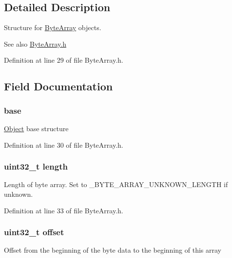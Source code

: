 \subsection{Detailed Description}
Structure for \hyperlink{struct_byte_array}{ByteArray} objects. 

\begin{DoxySeeAlso}{See also}
\hyperlink{_byte_array_8h}{ByteArray.h} 
\end{DoxySeeAlso}


Definition at line 29 of file ByteArray.h.



\subsection{Field Documentation}
\hypertarget{struct_byte_array_a23cf4ef56ba22bed625eab08d6361fa7}{
\subsubsection[{base}]{ {\bf base}}}
\label{struct_byte_array_a23cf4ef56ba22bed625eab08d6361fa7}
\hyperlink{struct_object}{Object} base structure 

Definition at line 30 of file ByteArray.h.

\hypertarget{struct_byte_array_aebb70c2aab3407a9f05334c47131a43b}{
\subsubsection[{length}]{\setlength{\rightskip}{0pt plus 5cm}uint32\_\-t {\bf length}}}
\label{struct_byte_array_aebb70c2aab3407a9f05334c47131a43b}
Length of byte array. Set to \_\-BYTE\_\-ARRAY\_\-UNKNOWN\_\-LENGTH if unknown. 

Definition at line 33 of file ByteArray.h.

\hypertarget{struct_byte_array_a894bdfa2d603d8343f8ef01dda6fcd23}{
\subsubsection[{offset}]{\setlength{\rightskip}{0pt plus 5cm}uint32\_\-t {\bf offset}}}
\label{struct_byte_array_a894bdfa2d603d8343f8ef01dda6fcd23}
Offset from the beginning of the byte data to the beginning of this array 

